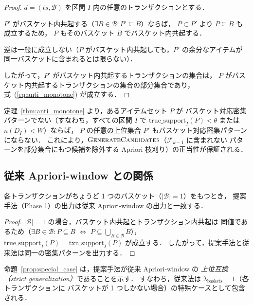 \begin{proof}
$d = (ts, \mathcal{B})$ を区間 $I$ 内の任意のトランザクションとする．

$P'$ がバスケット内共起する（$\exists B \in \mathcal{B}: P' \subseteq B$）ならば，
$P \subset P'$ より $P \subseteq B$ も成立するため，
$P$ もそのバスケット $B$ でバスケット内共起する．

逆は一般に成立しない（$P$ がバスケット内共起しても，$P'$ の余分なアイテムが
同一バスケットに含まれるとは限らない）．

したがって，$P'$ がバスケット内共起するトランザクションの集合は，
$P$ がバスケット内共起するトランザクションの集合の部分集合であり，
式~(\ref{eq:anti_monotone}) が成立する．
\end{proof}

定理~\ref{thm:anti_monotone} より，あるアイテムセット $P$ が
バスケット対応密集パターンでない（すなわち，すべての区間 $I$ で
$\text{true\_support}_I(P) < \theta$ または $n(D_I) < W$）ならば，
$P$ の任意の上位集合 $P'$ もバスケット対応密集パターンにならない．
これにより，$\Call{GenerateCandidates}{}$（$\mathcal{F}_{k-1}$ に含まれない
パターンを部分集合にもつ候補を除外する Apriori 枝刈り）の正当性が保証される．

\subsection{従来 Apriori-window との関係}
\label{sec:relationship}

\begin{proposition}[特殊ケースとしての従来法]
\label{prop:special_case}
各トランザクションがちょうど 1 つのバスケット（$|\mathcal{B}| = 1$）をもつとき，
提案手法（Phase 1）の出力は従来 Apriori-window の出力と一致する．
\end{proposition}

\begin{proof}
$|\mathcal{B}| = 1$ の場合，バスケット内共起とトランザクション内共起は
同値であるため（$\exists B \in \mathcal{B}: P \subseteq B$
$\Leftrightarrow$ $P \subseteq \bigcup_{B \in \mathcal{B}} B$），
$\text{true\_support}_I(P) = \text{txn\_support}_I(P)$ が成立する．
したがって，提案手法と従来法は同一の密集パターンを出力する．
\end{proof}

命題~\ref{prop:special_case} は，提案手法が従来 Apriori-window の
\emph{上位互換（strict generalization）}であることを示す．
すなわち，従来法は $\lambda_{\text{baskets}} = 1$（各トランザクションに
バスケットが 1 つしかない場合）の特殊ケースとして包含される．


